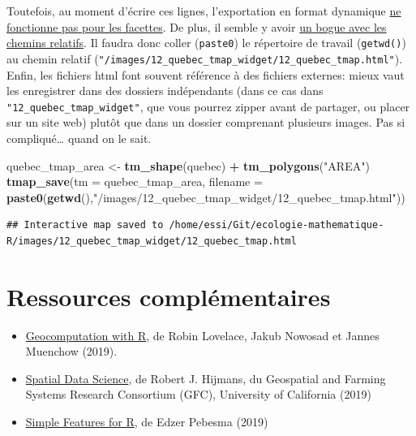 \documentclass[]{book}
\newenvironment{Shaded}{\begin{snugshade}}{\end{snugshade}}
\newcommand{\DataTypeTok}[1]{\textcolor[rgb]{0.13,0.29,0.53}{#1}}
\newcommand{\KeywordTok}[1]{\textcolor[rgb]{0.13,0.29,0.53}{\textbf{#1}}}
\newcommand{\NormalTok}[1]{#1}
\newcommand{\OperatorTok}[1]{\textcolor[rgb]{0.81,0.36,0.00}{\textbf{#1}}}
\newcommand{\StringTok}[1]{\textcolor[rgb]{0.31,0.60,0.02}{#1}}
\providecommand{\tightlist}{%
  \setlength{\itemsep}{0pt}\setlength{\parskip}{0pt}}
\begin{document}
Toutefois, au moment d'écrire ces lignes, l'exportation en format
dynamique \href{https://github.com/r-spatial/mapview/issues/35}{ne
fonctionne pas pour les facettes}. De plus, il semble y avoir
\href{https://stackoverflow.com/a/48691210}{un bogue avec les chemins
relatifs}. Il faudra donc coller (\texttt{paste0}) le répertoire de
travail (\texttt{getwd()}) au chemin relatif
(\texttt{"/images/12\_quebec\_tmap\_widget/12\_quebec\_tmap.html"}).
Enfin, les fichiers html font souvent référence à des fichiers externes:
mieux vaut les enregistrer dans des dossiers indépendants (dans ce cas
dans \texttt{"12\_quebec\_tmap\_widget"}, que vous pourrez zipper avant
de partager, ou placer sur un site web) plutôt que dans un dossier
comprenant plusieurs images. Pas si compliqué\ldots{} quand on le sait.

\begin{Shaded}
\begin{Highlighting}[]
\NormalTok{quebec_tmap_area <-}\StringTok{ }\KeywordTok{tm_shape}\NormalTok{(quebec) }\OperatorTok{+}
\StringTok{  }\KeywordTok{tm_polygons}\NormalTok{(}\StringTok{"AREA"}\NormalTok{)}
\KeywordTok{tmap_save}\NormalTok{(}\DataTypeTok{tm =}\NormalTok{ quebec_tmap_area, }\DataTypeTok{filename =} \KeywordTok{paste0}\NormalTok{(}\KeywordTok{getwd}\NormalTok{(),}\StringTok{"/images/12_quebec_tmap_widget/12_quebec_tmap.html"}\NormalTok{))}
\end{Highlighting}
\end{Shaded}

\begin{verbatim}
## Interactive map saved to /home/essi/Git/ecologie-mathematique-R/images/12_quebec_tmap_widget/12_quebec_tmap.html
\end{verbatim}

\hypertarget{ressources-compluxe9mentaires}{%
\section{Ressources
complémentaires}\label{ressources-compluxe9mentaires}}

\begin{itemize}
\tightlist
\item
  \href{https://geocompr.robinlovelace.net/}{Geocomputation with R}, de
  Robin Lovelace, Jakub Nowosad et Jannes Muenchow (2019).
\item
  \href{https://www.rspatial.org/}{Spatial Data Science}, de Robert J.
  Hijmans, du Geospatial and Farming Systems Research Consortium (GFC),
  University of California (2019)
\item
  \href{https://r-spatial.github.io/sf/index.html}{Simple Features for
  R}, de Edzer Pebesma (2019)
\end{itemize}
\end{document}
